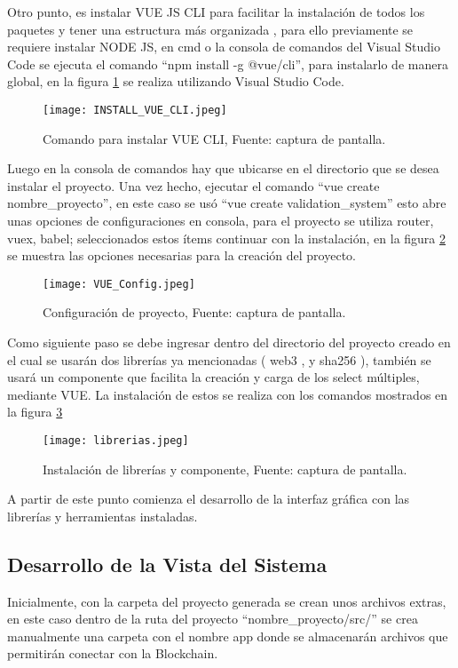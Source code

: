 Otro punto, es instalar  VUE JS CLI para facilitar la instalación de todos los paquetes y tener una estructura más organizada \cite[]{vue_cli_overview_2019},
para ello previamente se requiere instalar  NODE JS, en cmd o la consola de comandos del Visual 
Studio Code se ejecuta el comando “npm install -g @vue/cli”, para instalarlo de manera global,
en la figura \ref{img:INSTALL_VUE_CLI} se realiza utilizando Visual Studio Code.

\begin{figure}[H]
  \centering
  {\texttt{[image: INSTALL\_VUE\_CLI.jpeg]}}
  \caption{Comando para instalar VUE CLI, Fuente: captura de pantalla. }
  \label{img:INSTALL_VUE_CLI}
\end{figure}

Luego en la consola de comandos hay que ubicarse en el directorio que se desea instalar el proyecto. Una vez hecho, ejecutar el comando 
“vue create nombre\_proyecto”, en este caso se usó “vue create validation\_system” esto abre unas opciones de configuraciones en consola, 
para el proyecto se utiliza router, vuex, babel; seleccionados estos ítems continuar con la instalación, en la figura \ref{img:vue_config} se muestra
las opciones necesarias para la creación del proyecto.
\newpage
\begin{figure}[H]
  \centering
  {\texttt{[image: VUE\_Config.jpeg]}}
  \caption{Configuración de proyecto, Fuente: captura de pantalla. }
  \label{img:vue_config}
\end{figure}

Como siguiente paso se debe ingresar dentro del directorio del proyecto creado en el cual se usarán dos librerías ya mencionadas ( web3 \cite[]{web3js_web3js_2016}, y sha256 \cite[]{satoh_asic-hardware-focused_2007}), 
también se usará un componente
que facilita la creación y carga de los select múltiples, mediante VUE. La instalación de estos se realiza con los comandos mostrados en la figura \ref{img:libreria}

\begin{figure}[hbt!]
  \centering
  {\texttt{[image: librerias.jpeg]}}
  \caption{Instalación de librerías y componente, Fuente: captura de pantalla. }
  \label{img:libreria}
\end{figure}

A partir de este punto comienza el desarrollo de la interfaz gráfica con las librerías y herramientas instaladas.

\subsection{Desarrollo de la Vista del Sistema}
Inicialmente, con la carpeta del proyecto generada se crean unos archivos extras, en este caso dentro de la ruta del proyecto “nombre\_proyecto/src/” se crea manualmente una carpeta con el nombre \/app donde
se almacenarán archivos que permitirán conectar con la Blockchain.

